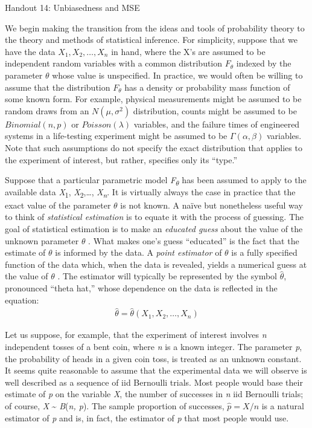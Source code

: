 \documentclass{tufte-handout}
\begin{document}
\justify

{\LARGE Handout 14: Unbiasedness and MSE}

\vspace*{18pt}

\noindent

We begin making the transition from the ideas and tools
of probability theory to the theory and methods of statistical
inference. For simplicity, suppose that we have the data
$X_1, X_2, \ldots, X_n$ in hand,
where the X's are assumed to be independent random variables with a
common distribution $F_\theta$ indexed by the parameter $\theta$
whose value is unspecified. In practice, we would often be willing to
assume that the distribution $F_\theta$ has a density or
probability mass function of some known form. For example, physical measurements
might be assumed to be random draws from an $N(\mu, \sigma^2)$
distribution, counts might be assumed to be
$Binomial(n, p)$ or $Poisson(\lambda)$ variables, and the failure times of
engineered systems in a life-testing experiment might be assumed to be
$\Gamma(\alpha, \beta)$ variables. Note that such assumptions do not
specify the exact distribution that applies to the experiment of
interest, but rather, specifies only its ``type.''

Suppose that a particular parametric model \emph{F}\textsubscript{$\theta$ } has
been assumed to apply to the available data \emph{X}\textsubscript{1},
\emph{X}\textsubscript{2},\ldots{}, \emph{X\textsubscript{n}}. It is
virtually always the case in practice that the exact value of the
parameter $\theta$  is not known. A naïve but nonetheless useful way to think of
\emph{statistical estimation} is to equate it with the process of
guessing. The goal of statistical estimation is to make an
\emph{educated guess} about the value of the unknown parameter $\theta$ . What
makes one's guess ``educated'' is the fact that the estimate of $\theta$  is
informed by the data. A \emph{point estimator} of $\theta$  is a fully specified
function of the data which, when the data is revealed, yields a
numerical guess at the value of $\theta$ . The estimator will typically be
represented by the symbol $\widehat{\theta}$,
pronounced ``theta hat,'' whose dependence on the data is reflected in
the equation:
\begin{align*}
\widehat{\theta} = \widehat{\theta}(X_1, X_2, \ldots, X_n)
\end{align*}

Let us suppose, for example, that the experiment of interest involves
\emph{n} independent tosses of a bent coin, where \emph{n} is a known
integer. The parameter \emph{p}, the probability of heads in a given
coin toss, is treated as an unknown constant. It seems quite reasonable
to assume that the experimental data we will observe is well described
as a sequence of iid Bernoulli trials. Most people would base their
estimate of \emph{p} on the variable \emph{X}, the number of successes
in \emph{n} iid Bernoulli trials; of course, \emph{X} \textasciitilde{}
\emph{B}(\emph{n, p}). The sample proportion of successes, $\widehat{p} = X /n$
is a natural estimator of \emph{p} and is, in fact, the estimator of
\emph{p} that most people would use.
\end{document}
